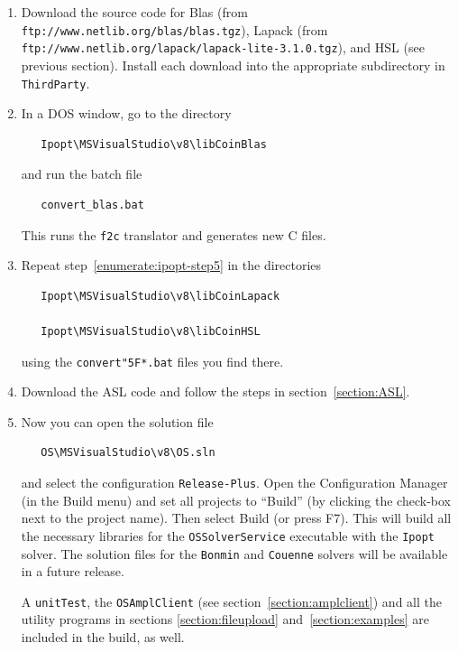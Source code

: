 \documentclass[11pt]{article}
\renewcommand{\_}{{\char"5F}}
\renewcommand{\{}{{\char"7B}}
\renewcommand{\}}{{\char"7D}}
\renewcommand{\^}{{\char"0D}}
\renewcommand{\'}{{\char"0D}}
\newcommand{\UrlBlas}{ftp://www.netlib.org/blas/blas.tgz}
\newcommand{\UrlLapack}{ftp://www.netlib.org/lapack/lapack-lite-3.1.0.tgz}
\begin{document}
\begin{enumerate}
\item{} Download the source code for Blas (from {\tt\UrlBlas}),
Lapack (from {\tt\UrlLapack}),
and HSL (see previous section).
Install each download into the appropriate subdirectory in {\tt ThirdParty}.

\item{} \label{enumerate:ipopt-step5}
In a DOS window, go to the directory

\begin{verbatim}
   Ipopt\MSVisualStudio\v8\libCoinBlas
\end{verbatim}

   and run the batch file

\begin{verbatim}
   convert_blas.bat
\end{verbatim}

   This runs the {\tt f2c} translator and generates new C files.%


\item{} Repeat step~\ref{enumerate:ipopt-step5} in the directories

\begin{verbatim}
   Ipopt\MSVisualStudio\v8\libCoinLapack

   Ipopt\MSVisualStudio\v8\libCoinHSL
\end{verbatim}

   using the {\tt convert\_*.bat} files you find there.

\item{}
   Download the ASL code and follow the steps in section~\ref{section:ASL}.

\item{}
Now you can open the solution file

\begin{verbatim}
   OS\MSVisualStudio\v8\OS.sln
\end{verbatim}

and select the configuration {\tt Release-Plus}.
Open the Configuration Manager (in the Build menu)
and set all projects to ``Build''
(by clicking the check-box next to the project name).
Then select Build (or press F7).
This will build all the necessary libraries for the
{\tt OSSolverService} executable
with the {\tt Ipopt} solver. The solution files for the {\tt Bonmin} 
and {\tt Couenne} solvers will be
available in a future release.

A {\tt unitTest},
the {\tt OSAmplClient} (see section~\ref{section:amplclient})
and all the utility programs in sections \ref{section:fileupload}
and~\ref{section:examples} are included in the build, as well.
\end{enumerate}
\end{document}

